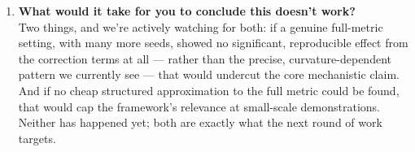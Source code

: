 \documentclass[11pt]{article}
\begin{document}
\begin{enumerate}[leftmargin=1.4em, itemsep=0.9em]
\item \textbf{What would it take for you to conclude this doesn't work?}\\
Two things, and we're actively watching for both: if a genuine full-metric setting, with many more
seeds, showed no significant, reproducible effect from the correction terms at all --- rather than
the precise, curvature-dependent pattern we currently see --- that would undercut the core
mechanistic claim. And if no cheap structured approximation to the full metric could be found,
that would cap the framework's relevance at small-scale demonstrations. Neither has happened yet;
both are exactly what the next round of work targets.

\end{enumerate}
\end{document}

